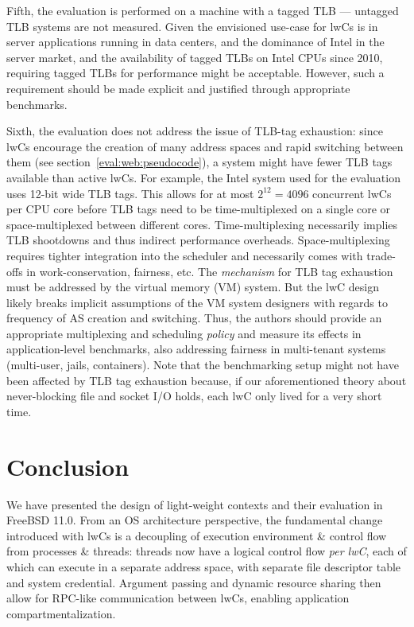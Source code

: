 \documentclass[10pt,twocolumn,a4paper]{article}
\begin{document}
Fifth, the evaluation is performed on a machine with a tagged TLB --- untagged TLB systems are not measured.
Given the envisioned use-case for lwCs is in server applications running in data centers, and the dominance of Intel in the server market, and the availability of tagged TLBs on Intel CPUs since 2010,
requiring tagged TLBs for performance might be acceptable.
However, such a requirement should be made explicit and justified through appropriate benchmarks.\cite{intelmarketshare}

Sixth, the evaluation does not address the issue of TLB-tag exhaustion:
since lwCs encourage the creation of many address spaces and rapid switching between them (see section~\ref{eval:web:pseudocode}), a system might have fewer TLB tags available than active lwCs.
For example, the Intel system used for the evaluation uses 12-bit wide TLB tags.
This allows for at most $2^{12}=4096$ concurrent lwCs per CPU core before TLB tags need to be time-multiplexed on a single core or space-multiplexed between different cores.
Time-multiplexing necessarily implies TLB shootdowns and thus indirect performance overheads.
Space-multiplexing requires tighter integration into the scheduler and necessarily comes with trade-offs in work-conservation, fairness, etc.
The \textit{mechanism} for TLB tag exhaustion must be addressed by the virtual memory (VM) system.
But the lwC design likely breaks implicit assumptions of the VM system designers with regards to frequency of AS creation and switching.
Thus, the authors should provide an appropriate multiplexing and scheduling \textit{policy} and measure its effects in application-level benchmarks, also addressing fairness in multi-tenant systems (multi-user, jails, containers).
Note that the benchmarking setup might not have been affected by TLB tag exhaustion because, if our aforementioned theory about never-blocking file and socket I/O holds, each lwC only lived for a very short time.

\section{Conclusion}\label{conclusion}
We have presented the design of light-weight contexts and their evaluation in FreeBSD 11.0.
From an OS architecture perspective, the fundamental change introduced with lwCs is a decoupling of execution environment \& control flow from processes \& threads:
threads now have a logical control flow \textit{per lwC}, each of which can execute in a separate address space, with separate file descriptor table and system credential.
Argument passing and dynamic resource sharing then allow for RPC-like communication between lwCs, enabling application compartmentalization.
\end{document}
